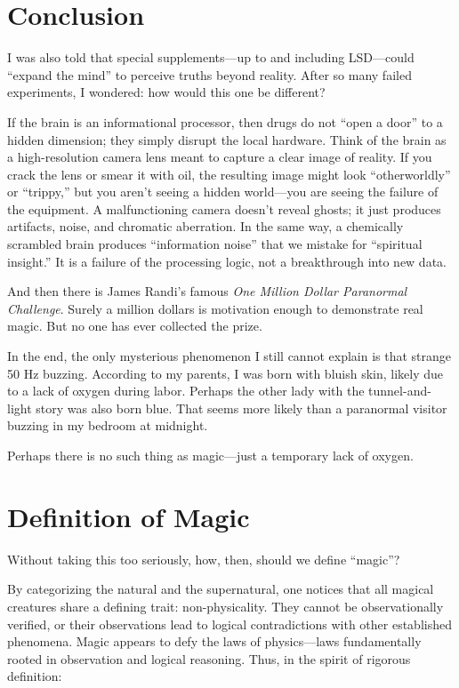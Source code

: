 \section{Conclusion}

I was also told that special supplements—up to and including LSD—could ``expand the mind'' to perceive truths beyond reality. After so many failed experiments, I wondered: how would this one be different?

If the brain is an informational processor, then drugs do not ``open a door'' to a hidden dimension; they simply disrupt the local hardware. Think of the brain as a high-resolution camera lens meant to capture a clear image of reality. If you crack the lens or smear it with oil, the resulting image might look ``otherworldly'' or ``trippy,'' but you aren't seeing a hidden world—you are seeing the failure of the equipment. A malfunctioning camera doesn’t reveal ghosts; it just produces artifacts, noise, and chromatic aberration. In the same way, a chemically scrambled brain produces ``information noise'' that we mistake for ``spiritual insight.'' It is a failure of the processing logic, not a breakthrough into new data.

And then there is James Randi’s famous \emph{One Million Dollar Paranormal Challenge}. Surely a million dollars is motivation enough to demonstrate real magic. But no one has ever collected the prize.

In the end, the only mysterious phenomenon I still cannot explain is that strange 50 Hz buzzing. According to my parents, I was born with bluish skin, likely due to a lack of oxygen during labor. Perhaps the other lady with the tunnel-and-light story was also born blue. That seems more likely than a paranormal visitor buzzing in my bedroom at midnight.

Perhaps there is no such thing as magic—just a temporary lack of oxygen.


\section{Definition of Magic}

Without taking this too seriously, how, then, should we define ``magic''?

By categorizing the natural and the supernatural, one notices that all magical creatures share a defining trait: non-physicality.
They cannot be observationally verified, or their observations lead to logical contradictions with other established phenomena.
Magic appears to defy the laws of physics—laws fundamentally rooted in observation and logical reasoning.
Thus, in the spirit of rigorous definition:


